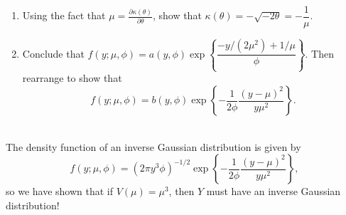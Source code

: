 \documentclass[11pt]{article}
\begin{document}
\begin{enumerate}
\begin{enumerate}
\item Using the fact that $\mu = \frac{\partial \kappa(\theta)}{\partial \theta}$, show that $\kappa(\theta) = - \sqrt{- 2 \theta} = -\dfrac{1}{\mu}$.

\item Conclude that $f(y; \mu, \phi) = a(y, \phi) \exp \left \lbrace \dfrac{-y/(2 \mu^2) + 1/\mu}{\phi} \right\rbrace$. Then rearrange to show that 
$$f(y; \mu, \phi) = b(y, \phi) \exp \left \lbrace -\dfrac{1}{2\phi}\dfrac{(y - \mu)^2}{y \mu^2} \right\rbrace. $$\\
\end{enumerate}

The density function of an inverse Gaussian distribution is given by
$$f(y; \mu, \phi) = (2 \pi y^3 \phi)^{-1/2} \exp \left \lbrace -\dfrac{1}{2\phi}\dfrac{(y - \mu)^2}{y \mu^2} \right\rbrace, $$
so we have shown that if $V(\mu) = \mu^3$, then $Y$ must have an inverse Gaussian distribution!
\end{enumerate}
\end{document}

